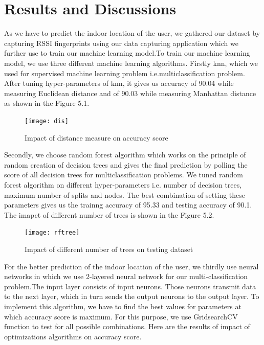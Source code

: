 
\chapter{Results and Discussions} %
\label{Chapter5}

As we have  to predict the indoor location of the user, we gathered our dataset by capturing RSSI fingerprints using our data capturing application which we further use to train our machine learning model.To train our machine learning model, we use three different machine learning algorithms. Firstly knn, which we used for supervised machine learning problem i.e.multiclassification problem. After tuning hyper-parameters of knn, it gives us accuracy of 90.04 while measuring Euclidean distance and of 90.03 while measuring Manhattan distance as shown in the Figure 5.1. 
\begin{figure}[h]
\begin{center}
\texttt{[image: dis]}
\caption{Impact of distance measure on accuracy score}
\label{fig:1}
\end{center}
\end{figure}
Secondly, we choose random forest algorithm which works on the principle of random creation of decision trees and gives the final prediction by polling the score of all decision trees for multiclassification problems. We tuned random forest algorithm on different hyper-parameters i.e. number of decision trees, maximum number of splits and nodes. The best combination of setting these parameters gives us the trainng accuracy of 95.33 and testing accuracy of 90.1. The imapct of different number of trees  is shown in the Figure 5.2. 

\begin{figure}[h]
\begin{center}
\texttt{[image: rftree]}
\caption{Impact of different number of trees on testing dataset}
\label{fig:2}
\end{center}
\end{figure}


For the better prediction of the indoor location of the user, we thirdly use neural networks in which we use 2-layered neural network for our multi-classification problem.The input layer consists of input neurons. Those neurons transmit data to the next layer, which in turn sends the output neurons to the output layer. To implement this algorithm, we have to find the best values for parameters at which accuracy score is maximum. For this purpose, we use GridsearchCV function to test for all possible combinations. Here are the results of impact of optimizations algorithms on accuracy score.

